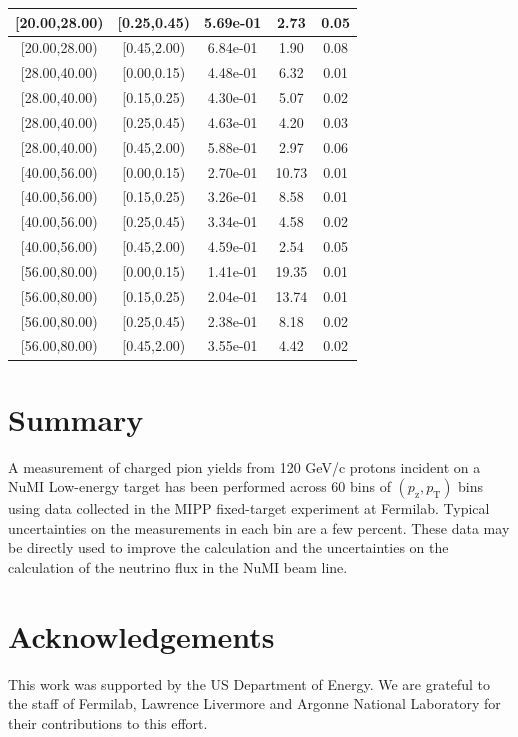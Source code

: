 \documentclass[%
aps, prd, reprint, show pacs, preprint numbers, ams math, amssymb, superscriptaddress, linenumbers]{revtex4-1}
\def\pzpt{$(p_\mathrm{z},p_\mathrm{T})$\xspace}
\begin{document}
\begin{table}
\begin{tabular}{|c|c|c|c|c|}
 \hline
[20.00,28.00) & [0.25,0.45) & 5.69e-01 & 2.73 & 0.05 \\ 
 \hline
[20.00,28.00) & [0.45,2.00) & 6.84e-01 & 1.90 & 0.08 \\ 
 \hline
[28.00,40.00) & [0.00,0.15) & 4.48e-01 & 6.32 & 0.01 \\ 
 \hline
[28.00,40.00) & [0.15,0.25) & 4.30e-01 & 5.07 & 0.02 \\ 
 \hline
[28.00,40.00) & [0.25,0.45) & 4.63e-01 & 4.20 & 0.03 \\ 
 \hline
[28.00,40.00) & [0.45,2.00) & 5.88e-01 & 2.97 & 0.06 \\ 
 \hline
[40.00,56.00) & [0.00,0.15) & 2.70e-01 & 10.73 & 0.01 \\ 
 \hline
[40.00,56.00) & [0.15,0.25) & 3.26e-01 & 8.58 & 0.01 \\ 
 \hline
[40.00,56.00) & [0.25,0.45) & 3.34e-01 & 4.58 & 0.02 \\ 
 \hline
[40.00,56.00) & [0.45,2.00) & 4.59e-01 & 2.54 & 0.05 \\ 
 \hline
[56.00,80.00) & [0.00,0.15) & 1.41e-01 & 19.35 & 0.01 \\ 
 \hline
[56.00,80.00) & [0.15,0.25) & 2.04e-01 & 13.74 & 0.01 \\ 
 \hline
[56.00,80.00) & [0.25,0.45) & 2.38e-01 & 8.18 & 0.02 \\ 
 \hline
[56.00,80.00) & [0.45,2.00) & 3.55e-01 & 4.42 & 0.02 \\ 
 \hline
\end{tabular}
\label{table:FinalPiRatios}
\end{table}

\section{Summary}
A measurement of charged pion yields from 120 GeV/c protons incident on a NuMI Low-energy target has been performed across 60 bins of \pzpt bins using data collected in the MIPP fixed-target experiment at Fermilab.  Typical uncertainties on the measurements in each bin are a few percent.  These data may be directly used to improve the calculation and the uncertainties on the calculation of the neutrino flux in the NuMI beam line.

\section{Acknowledgements}
This work was supported by the US Department of Energy.  We are grateful to the staff of Fermilab, Lawrence Livermore and Argonne National Laboratory for their contributions to this effort.
\end{document}
